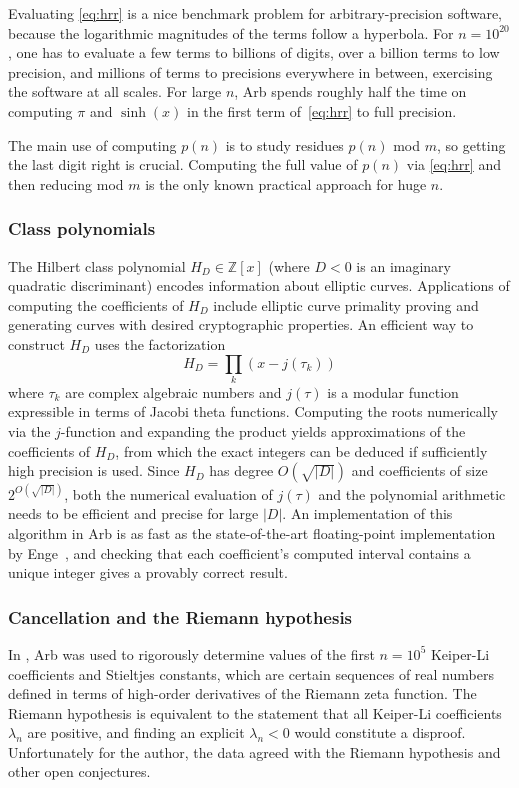 \documentclass[10pt,journal,compsoc,cspaper]{IEEEtran}
\begin{document}
Evaluating \eqref{eq:hrr} is a nice benchmark
problem for arbitrary-precision software, because the logarithmic magnitudes
of the terms follow a hyperbola. For $n=10^{20}$,
one has to evaluate a few terms to billions of digits,
over a billion terms to low precision, and millions of terms to
precisions everywhere in between,
exercising the software at all scales.
For large $n$, Arb spends roughly half the time on computing $\pi$ and $\sinh(x)$ in
the first term of~\eqref{eq:hrr} to full precision.

The main use of computing $p(n)$ is to study residues $p(n)$ mod $m$,
so getting the last digit right is crucial.
Computing the full value of $p(n)$ via \eqref{eq:hrr} and then reducing
mod $m$ is the only known practical approach for huge $n$.

\subsubsection{Class polynomials}

The Hilbert class polynomial $H_D \in \mathbb{Z}[x]$ (where $D < 0$
is an imaginary quadratic discriminant) encodes
information about elliptic curves.
Applications of computing the coefficients of $H_D$ include
elliptic curve primality proving and generating curves with
desired cryptographic properties. An efficient way to construct $H_D$
uses the factorization
$$H_D = \prod_k (x - j(\tau_k))$$
where $\tau_k$ are complex algebraic numbers
and $j(\tau)$ is a modular function
expressible in terms of Jacobi theta functions.
Computing the roots numerically via the $j$-function
and expanding the product yields approximations of the
coefficients of $H_D$, from
which the exact integers can be deduced if
sufficiently high precision is used.
Since $H_D$ has degree $O(\sqrt{|D|})$ and
coefficients of size $2^{O(\sqrt{|D|})}$,
both the numerical evaluation of $j(\tau)$ and the polynomial arithmetic
needs to be efficient and precise for large $|D|$.
An implementation of this algorithm in Arb is as fast as the state-of-the-art
floating-point implementation by Enge~\cite{enge2009complexity},
and checking that each coefficient's computed interval
contains a unique integer gives a provably correct result.

\subsubsection{Cancellation and the Riemann hypothesis}

In \cite{Johansson2014hurwitz}, Arb was used to
rigorously determine values
of the first $n = 10^5$ Keiper-Li coefficients
and Stieltjes constants, which are certain
sequences of real numbers defined in terms of
high-order derivatives of the Riemann zeta function.
The Riemann hypothesis is equivalent to the statement
that all Keiper-Li coefficients $\lambda_n$ are positive,
and finding an explicit $\lambda_n < 0$
would constitute a disproof.
Unfortunately for the author, the data agreed
with the Riemann hypothesis
and other open conjectures.
\end{document}
